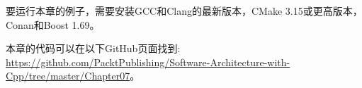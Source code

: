 要运行本章的例子，需要安装GCC和Clang的最新版本，CMake 3.15或更高版本，Conan和Boost 1.69。

本章的代码可以在以下GitHub页面找到: \url{https://github.com/PacktPublishing/Software-Architecture-with-Cpp/tree/master/Chapter07}。